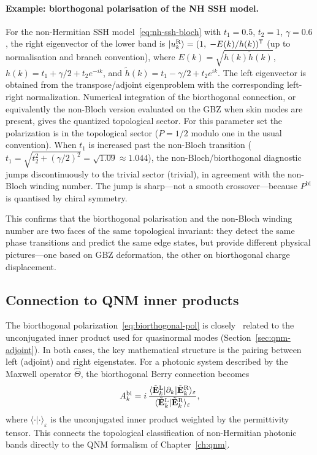 \paragraph{Example: biorthogonal polarisation of the NH SSH model.}
For the non-Hermitian SSH model~\eqref{eq:nh-ssh-bloch} with
$t_1 = 0.5$, $t_2 = 1$, $\gamma = 0.6$, the right eigenvector of the
lower band is
$|u_k^{\mathrm{R}}\rangle = (1,\; -E(k)/h(k))^{\mathsf{T}}$ (up to
normalisation and branch convention), where $E(k) = \sqrt{h(k)\tilde{h}(k)}$,
$h(k) = t_1 + \gamma/2 + t_2 e^{-ik}$, and
$\tilde{h}(k) = t_1 - \gamma/2 + t_2 e^{ik}$. The left eigenvector is
obtained from the transpose/adjoint eigenproblem with the corresponding
left-right normalization. Numerical integration of the biorthogonal
connection, or equivalently the non-Bloch version evaluated on the GBZ
when skin modes are present, gives the quantized topological sector.
For this parameter set the polarization is in the topological sector
($P=1/2$ modulo one in the usual convention). When $t_1$ is increased
past the non-Bloch transition
($t_1 = \sqrt{t_2^2 + (\gamma/2)^2} = \sqrt{1.09} \approx 1.044$),
the non-Bloch/biorthogonal diagnostic jumps discontinuously to the trivial sector
(trivial), in agreement with the non-Bloch winding number. The jump
is sharp---not a smooth crossover---because $P^{\mathrm{bi}}$ is
quantised by chiral symmetry.

This confirms that the biorthogonal polarisation and the non-Bloch
winding number are two faces of the same topological invariant: they
detect the same phase transitions and predict the same edge states,
but provide different physical pictures---one based on GBZ deformation,
the other on biorthogonal charge displacement.

\subsection{Connection to QNM inner products}
\label{ssec:biorthogonal-qnm}

The biorthogonal polarization~\eqref{eq:biorthogonal-pol} is closely~\cite{kunst2018biorthogonal}
related to the unconjugated inner product used for quasinormal modes
(Section~\ref{sec:qnm-adjoint}). In both cases, the key mathematical
structure is the pairing between left (adjoint) and right eigenstates.
For a photonic system described by the Maxwell operator
$\hat{\Theta}$, the biorthogonal Berry connection becomes
\begin{equation}
 A_k^{\mathrm{bi}} = i\,
 \frac{\langle\tilde{\mathbf{E}}_k^{\mathrm{L}}|
 \partial_k|\tilde{\mathbf{E}}_k^{\mathrm{R}}\rangle_{\varepsilon}}
 {\langle\tilde{\mathbf{E}}_k^{\mathrm{L}}|
 \tilde{\mathbf{E}}_k^{\mathrm{R}}\rangle_{\varepsilon}},
 \label{eq:biorthogonal-berry-bbc}
\end{equation}
where $\langle\cdot|\cdot\rangle_\varepsilon$ is the unconjugated
inner product weighted by the permittivity tensor. This connects the
topological classification of non-Hermitian photonic bands directly to
the QNM formalism of Chapter~\ref{ch:qnm}.

